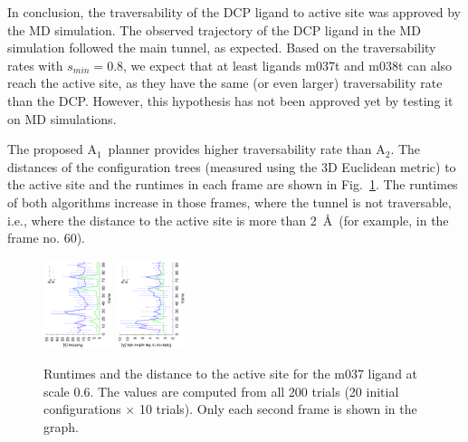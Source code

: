 \documentclass[usletter, 10pt, conference]{ieeeconf} %
\def\smin{s_{min}}
\def\RA{A$_{1}$}
\def\RB{A$_{2}$}
\begin{document}
In conclusion, the traversability of the DCP ligand to active site was approved by the MD simulation.
The observed trajectory of the DCP ligand in the MD simulation followed the main tunnel, as expected.
Based on the traversability rates with $\smin=0.8$, we expect that at least ligands m037t and m038t can also reach the active site, as
they have the same (or even larger) traversability rate than the DCP.
However, this hypothesis has not been approved yet by testing it on MD simulations.

The proposed \RA\ planner provides higher traversability rate than \RB.
The distances of the configuration trees (measured using the 3D Euclidean metric) to the active site and the runtimes in each frame
are shown in Fig.~\ref{fig::comparison}.
The runtimes of both algorithms increase in those frames, where the tunnel is not traversable, i.e., where the distance
to the active site is more than 2~\AA\ (for example, in the frame no. 60).

{\def\a{270}
\begin{figure}[hb]
\centering
\includegraphics[width=0.18\textwidth,angle=\a]{fig/crop1}
\includegraphics[width=0.18\textwidth,angle=\a]{fig/crop2}
\caption{\label{fig::comparison}
    Runtimes and the distance to the active site for the m037 ligand at scale 0.6.
    The values are computed from all 200 trials (20 initial configurations $\times$ 10 trials).
    Only each second frame is shown in the graph.
}
\end{figure}
}
\end{document}
